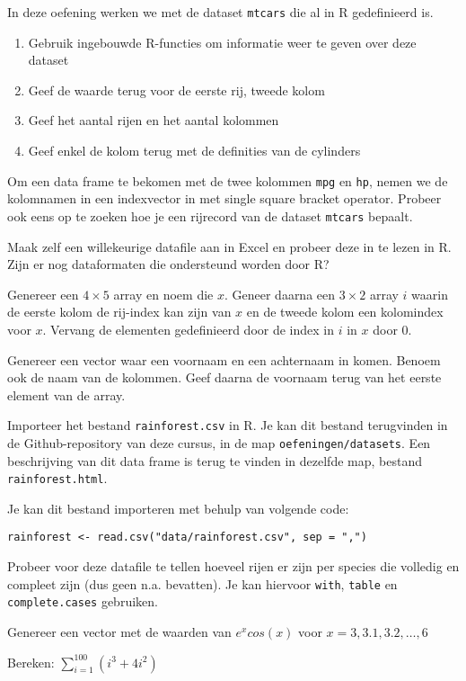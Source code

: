 \begin{exercise}
    In deze oefening werken we met de dataset \texttt{mtcars} die al in R gedefinieerd is.
    \begin{enumerate}
        \item   Gebruik ingebouwde R-functies om informatie weer te geven over deze dataset
        \item   Geef de waarde terug voor de eerste rij, tweede kolom
        \item   Geef het aantal rijen en het aantal kolommen
        \item   Geef enkel de kolom terug met de definities van de cylinders
    \end{enumerate}

    Om een data frame te bekomen met de twee kolommen \texttt{mpg} en \texttt{hp}, nemen we de kolomnamen in een indexvector in met single square bracket operator. Probeer ook eens op te zoeken hoe je een rijrecord van de dataset \texttt{mtcars} bepaalt.
\end{exercise}

\begin{exercise}
  Maak zelf een willekeurige datafile aan in Excel en probeer deze in te lezen in R. Zijn er nog dataformaten die ondersteund worden door R?
\end{exercise}

\begin{exercise}
  Genereer een $4 \times 5$ array en noem die $x$. Geneer daarna een $3 \times 2$ array $i$ waarin de eerste kolom de rij-index kan zijn van $x$ en de tweede kolom een kolomindex voor $x$. Vervang de elementen gedefinieerd door de index in $i$ in $x$ door 0. 
\end{exercise}

\begin{exercise}
  Genereer een vector waar een voornaam en een achternaam in komen. Benoem ook de naam van de kolommen. Geef daarna de voornaam terug van het eerste element van de array. 
\end{exercise}

\begin{exercise}
  Importeer het bestand \texttt{rainforest.csv} in R.
  Je kan dit bestand terugvinden in de Github-repository van deze cursus, in de map \texttt{oefeningen/datasets}. 
  Een beschrijving van dit data frame is terug te vinden in dezelfde map, bestand \texttt{rainforest.html}.
    
  Je kan dit bestand importeren met behulp van volgende code:
  \begin{lstlisting}
rainforest <- read.csv("data/rainforest.csv", sep = ",")
  \end{lstlisting}
  
  Probeer voor deze datafile te tellen hoeveel rijen er zijn per species die volledig en compleet zijn (dus geen n.a. bevatten). 
  Je kan hiervoor \texttt{with}, \texttt{table} en \texttt{complete.cases} gebruiken. 
\end{exercise}

\begin{exercise}
	Genereer een vector met de waarden van $e^x cos(x)$ voor $x= 3, 3.1, 3.2, \dots ,6$
\end{exercise}

\begin{exercise}
	Bereken: $\sum_{i=1}^{100}(i^3 + 4i^2)$
\end{exercise}
